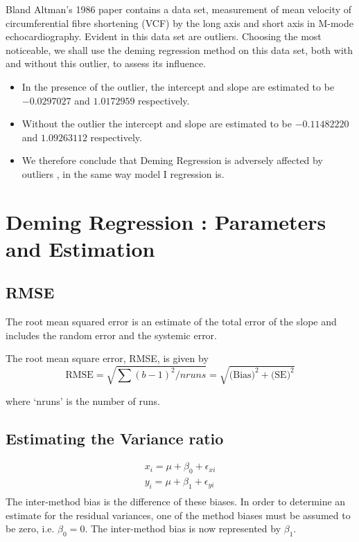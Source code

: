 \documentclass[12pt, a4paper]{report}
\theoremstyle{plain}
\theoremstyle{definition}
\theoremstyle{remark}
\begin{document}
Bland Altman's 1986 paper contains a data set, measurement of mean velocity of circumferential fibre shortening (VCF) by the long axis and short axis in M-mode echocardiography. Evident in this data set are outliers. Choosing the most noticeable, we shall use the deming regression method on this data set, both with and
without this outlier, to assess its influence.
\begin{itemize}
	\item In the presence of the outlier, the intercept and slope are estimated to be $-0.0297027$ and $1.0172959$ respectively.
	\item Without the outlier the intercept and slope are estimated to be
	$-0.11482220$ and  $1.09263112$ respectively.
	\item We therefore conclude that Deming Regression is adversely affected
	by outliers , in the same way model I regression is.
\end{itemize}



\section{Deming Regression : Parameters and Estimation}


\subsection{RMSE} 


The root mean squared error is an estimate of the total error of the slope and includes the random error and the systemic error.

The root mean square error, RMSE,  is given by
\begin{equation*}
	\mbox{RMSE} = \sqrt{\sum{(b-1)^2/nruns}} =
	\sqrt{\mbox{(Bias)}^{2}+ \mbox{(SE)}^{2}}
\end{equation*}

where `nruns' is the number of runs.

\subsection{Estimating the Variance ratio}
\begin{eqnarray*}
	x_{i} = \mu +  \beta_{0} + \epsilon_{xi}\\
	y_{i} = \mu +  \beta_{1} + \epsilon_{yi}\\
\end{eqnarray*}
The inter-method bias is the difference of these biases. In order to determine an estimate for the residual variances, one of the method biases must be assumed to be zero, i.e. $\beta_{0} = 0$. The inter-method bias is now represented by $\beta_{1}$.
\end{document}
